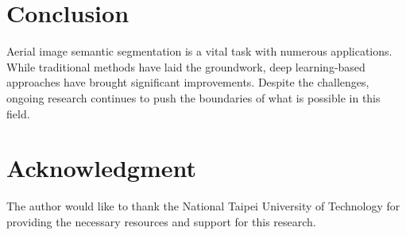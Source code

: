 \documentclass[conference]{IEEEtran}
\begin{document}
\section{Conclusion}
Aerial image semantic segmentation is a vital task with numerous applications. While traditional methods have laid the groundwork, deep learning-based approaches have brought significant improvements. Despite the challenges, ongoing research continues to push the boundaries of what is possible in this field.

\section*{Acknowledgment}
The author would like to thank the National Taipei University of Technology for providing the necessary resources and support for this research.



\end{document}
